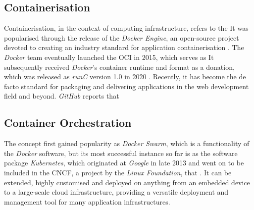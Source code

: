 \subsection{Containerisation}

Containerisation, in the context of computing infrastructure, refers to the  It was popularised through the release of the \emph{Docker Engine}, an open-source project devoted to creating an industry standard for application containerisation \parencite{dockerRelease}. The \emph{Docker} team eventually launched the \ac{OCI} in 2015, which serves as  It subsequently received \emph{Docker}'s container runtime and format as a donation, which was released as \emph{runC} version 1.0 in 2020 \parencite{openContainerInitiative}. Recently, it has become the de facto standard for packaging and delivering applications in the web development field and beyond. \emph{GitHub} reports that 

\subsection{Container Orchestration}

 The concept first gained popularity as \emph{Docker Swarm}, which is a functionality of the \emph{Docker} software, but its most successful instance so far is as the software package \emph{Kubernetes}, which originated at \emph{Google} in late 2013 \parencite{kubernetesHistory} and went on to be included in the \ac{CNCF}, a project by the \emph{Linux Foundation}, that . It can be extended, highly customised and deployed on anything from an embedded device to a large-scale cloud infrastructure, providing a versatile deployment and management tool for many application infrastructures.
